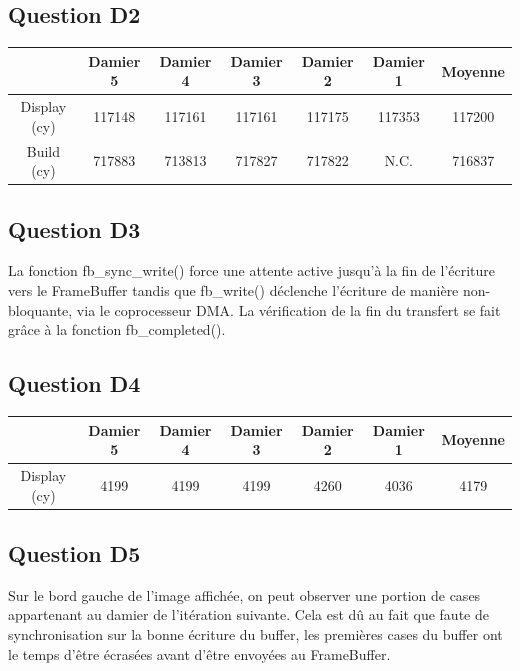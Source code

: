 \documentclass[10pt]{article}
\begin{document}
\subsection{Question D2}
\begin{center}
  \begin{tabular}{|c|c|c|c|c|c|c|}
    \hline
     & Damier 5 & Damier 4 & Damier 3 & Damier 2 & Damier 1 & Moyenne \\ \hline
     Display (cy) & 117148 & 117161 & 117161 & 117175 & 117353 & 117200 \\ \hline
     Build (cy) & 717883 & 713813 & 717827 & 717822 & N.C. & 716837 \\ \hline
  \end{tabular}
\end{center}

\subsection{Question D3}

La fonction fb\_sync\_write() force une attente active jusqu'à la fin de
l'écriture vers le FrameBuffer tandis que fb\_write() déclenche l'écriture de
manière non-bloquante, via le coprocesseur DMA. La vérification de la fin du
transfert se fait grâce à la fonction fb\_completed().

\subsection{Question D4}
\begin{center}
  \begin{tabular}{|c|c|c|c|c|c|c|}
    \hline
     & Damier 5 & Damier 4 & Damier 3 & Damier 2 & Damier 1 & Moyenne \\ \hline
     Display (cy) & 4199 & 4199 & 4199 & 4260 & 4036 & 4179 \\ \hline
  \end{tabular}
\end{center}

\subsection{Question D5}
Sur le bord gauche de l'image affichée, on peut observer une portion de cases
appartenant au damier de l'itération suivante. Cela est dû au fait que faute
de synchronisation sur la bonne écriture du buffer, les premières cases du
buffer ont le temps d'être écrasées avant d'être envoyées au FrameBuffer.
\end{document}
